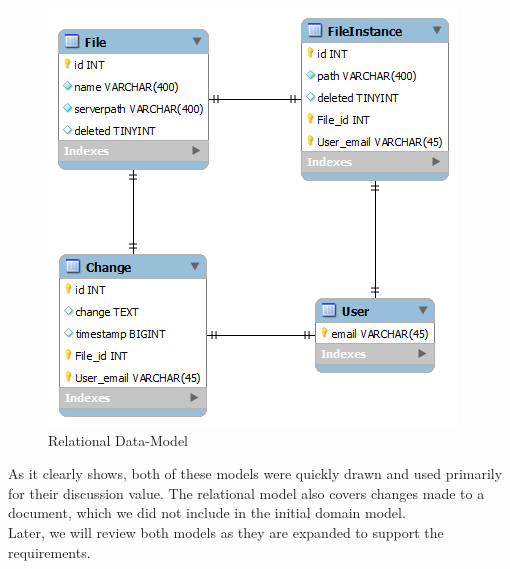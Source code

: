 \begin{figure}[H]
  \includegraphics[width=\textwidth,natwidth=410,natheight=418]{illustrations/RelationalData-model.png}
  \caption{Relational Data-Model}
  \label{relationalmodel}
\end{figure}
As it clearly shows, both of these models were quickly drawn and used primarily for their discussion value. The relational model also covers changes made to a document, which we did not include in the initial domain model.\\
Later, we will review both models as they are expanded to support the requirements.\\
